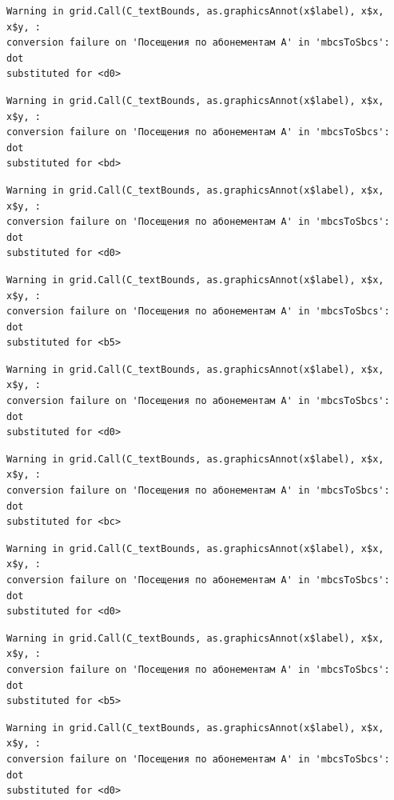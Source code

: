\documentclass[
  letterpaper,
  DIV=11,
  numbers=noendperiod]{scrartcl}
\begin{document}
\begin{verbatim}
Warning in grid.Call(C_textBounds, as.graphicsAnnot(x$label), x$x, x$y, :
conversion failure on 'Посещения по абонементам А' in 'mbcsToSbcs': dot
substituted for <d0>
\end{verbatim}

\begin{verbatim}
Warning in grid.Call(C_textBounds, as.graphicsAnnot(x$label), x$x, x$y, :
conversion failure on 'Посещения по абонементам А' in 'mbcsToSbcs': dot
substituted for <bd>
\end{verbatim}

\begin{verbatim}
Warning in grid.Call(C_textBounds, as.graphicsAnnot(x$label), x$x, x$y, :
conversion failure on 'Посещения по абонементам А' in 'mbcsToSbcs': dot
substituted for <d0>
\end{verbatim}

\begin{verbatim}
Warning in grid.Call(C_textBounds, as.graphicsAnnot(x$label), x$x, x$y, :
conversion failure on 'Посещения по абонементам А' in 'mbcsToSbcs': dot
substituted for <b5>
\end{verbatim}

\begin{verbatim}
Warning in grid.Call(C_textBounds, as.graphicsAnnot(x$label), x$x, x$y, :
conversion failure on 'Посещения по абонементам А' in 'mbcsToSbcs': dot
substituted for <d0>
\end{verbatim}

\begin{verbatim}
Warning in grid.Call(C_textBounds, as.graphicsAnnot(x$label), x$x, x$y, :
conversion failure on 'Посещения по абонементам А' in 'mbcsToSbcs': dot
substituted for <bc>
\end{verbatim}

\begin{verbatim}
Warning in grid.Call(C_textBounds, as.graphicsAnnot(x$label), x$x, x$y, :
conversion failure on 'Посещения по абонементам А' in 'mbcsToSbcs': dot
substituted for <d0>
\end{verbatim}

\begin{verbatim}
Warning in grid.Call(C_textBounds, as.graphicsAnnot(x$label), x$x, x$y, :
conversion failure on 'Посещения по абонементам А' in 'mbcsToSbcs': dot
substituted for <b5>
\end{verbatim}

\begin{verbatim}
Warning in grid.Call(C_textBounds, as.graphicsAnnot(x$label), x$x, x$y, :
conversion failure on 'Посещения по абонементам А' in 'mbcsToSbcs': dot
substituted for <d0>
\end{verbatim}
\end{document}
